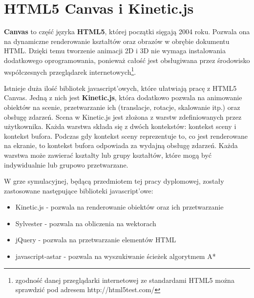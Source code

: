 \section{HTML5 Canvas i Kinetic.js}
\textbf{Canvas} to część języka \textbf{HTML5}, której początki sięgają 2004 roku. Pozwala ona na dynamiczne renderowanie kształtów oraz obrazów w obrębie dokumentu HTML. Dzięki temu tworzenie animacji 2D i 3D nie wymaga instalowania dodatkowego oprogramowania, ponieważ całość jest obsługiwana przez środowisko współczesnych przeglądarek internetowych\footnote{zgodność danej przeglądarki internetowej ze standardami HTML5 można sprawdzić pod adresem http://html5test.com/}.

Istnieje duża ilość bibliotek javascript'owych, które ułatwiają pracę z HTML5 Canvas. Jedną z nich jest \textbf{Kinetic.js}, która dodatkowo pozwala na animowanie obiektów na scenie, przetwarzanie ich (translacje, rotacje, skalowanie itp.) oraz obsługę zdarzeń. Scena w Kinetic.js jest złożona z warstw zdefiniowanych przez użytkownika. Każda warstwa składa się z dwóch kontekstów: kontekst sceny i kontekst bufora. Podczas gdy kontekst sceny reprezentuje to, co jest renderowane na ekranie, to kontekst bufora odpowiada za wydajną obsługę zdarzeń. Każda warstwa może zawierać kształty lub grupy kształtów, które mogą być indywidualnie lub grupowo przetwarzane.

W grze symulacyjnej, będącą przedmiotem tej pracy dyplomowej, zostały zastosowane następujące biblioteki javascript'owe:
\begin{itemize}
	\item Kinetic.js\cite{kineticPage} - pozwala na renderowanie obiektów oraz ich przetwarzanie
	\item Sylvester\cite{sylvesterPage} - pozwala na obliczenia na wektorach 
	\item jQuery\cite{jqueryPage} - pozwala na przetwarzanie elementów HTML
	\item javascript-astar\cite{astarPage} - pozwala na wyszukiwanie ścieżek algorytmem A*
\end{itemize}
